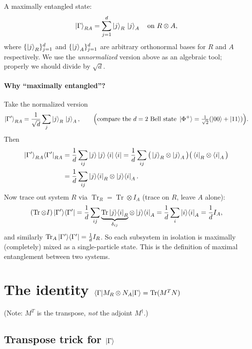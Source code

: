 \documentclass[11pt]{article}
\newcommand{\Tr}{\operatorname{Tr}}
\begin{document}
A maximally entangled state:
\[
\ket{\Gamma}_{RA} = \sum_{j=1}^{d} \ket{j}_R\,\ket{j}_A \quad\text{on } R\otimes A,
\]
where $\{\ket{j}_R\}_{j=1}^{d}$ and $\{\ket{j}_A\}_{j=1}^{d}$ are arbitrary
orthonormal bases for $R$ and $A$ respectively. We use the \emph{unnormalized}
version above as an algebraic tool; properly we should divide by $\sqrt{d}$.

\paragraph{Why ``maximally entangled''?}
Take the normalized version
\[
\ket{\Gamma'}_{RA} = \frac{1}{\sqrt{d}}\sum_j \ket{j}_R\,\ket{j}_A,
\qquad
\Big(\text{compare the } d=2 \text{ Bell state } \ket{\Phi^{+}} = \tfrac{1}{\sqrt2}(\ket{00}+\ket{11})\Big).
\]
Then
\begin{align*}
\ket{\Gamma'}_{RA}\!\bra{\Gamma'}_{RA}
&= \frac1d\sum_{ij}\ket{j}\ket{j}\bra{i}\bra{i}
= \frac1d\sum_{ij}\big(\ket{j}_R\otimes\ket{j}_A\big)\big(\bra{i}_R\otimes\bra{i}_A\big)\\
&= \frac1d\sum_{ij}\ket{j}\!\bra{i}_R \otimes \ket{j}\!\bra{i}_A.
\end{align*}
Now trace out system $R$ via $\Tr_R = \Tr\otimes I_A$ (trace on $R$, leave $A$
alone):
\[
(\Tr\otimes I)\ket{\Gamma'}\!\bra{\Gamma'}
= \frac1d\sum_{ij}\underbrace{\Tr\ket{j}\!\bra{i}_R}_{\delta_{ij}}\otimes\ket{j}\!\bra{i}_A
= \frac1d\sum_i \ket{i}\!\bra{i}_A
= \frac1d I_A,
\]
and similarly $\Tr_A\ket{\Gamma'}\!\bra{\Gamma'} = \tfrac1d I_R$. So each
subsystem in isolation is maximally (completely) mixed as a single-particle
state. This is the definition of maximal entanglement between two systems.

\section{The identity \texorpdfstring{$\braket{\Gamma|M_R\otimes N_A|\Gamma}=\Tr(M^{T}N)$}{Gamma identity}}

(Note: $M^{T}$ is the transpose, \emph{not} the adjoint $M^{\dagger}$.)

\subsection{Transpose trick for \texorpdfstring{$\ket{\Gamma}$}{Gamma}}
\end{document}
